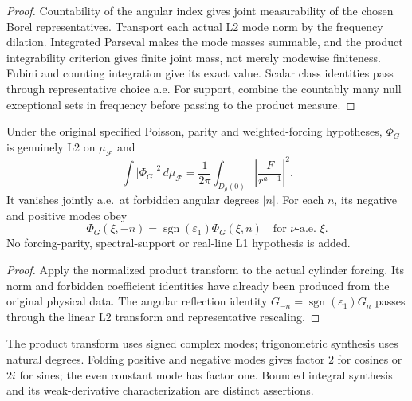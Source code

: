 \begin{proof}
\leanok
Countability of the angular index gives joint measurability of the chosen
Borel representatives. Transport each actual L2 mode norm by the frequency
dilation. Integrated Parseval makes the mode masses summable, and the product
integrability criterion gives finite joint mass, not merely modewise finiteness.
Fubini and counting integration give its exact value.
Scalar class identities pass through representative choice a.e.
For support, combine the countably many null exceptional sets in frequency
before passing to the product measure.
\end{proof}

\begin{lemma}
\label{lem:cylinder-forcing-fourier-data}
\leanok
Under the original specified Poisson, parity and weighted-forcing hypotheses,
$\Phi_G$ is genuinely L2 on $\mu_{\mathcal F}$ and
\[
 \int|\Phi_G|^2\,d\mu_{\mathcal F}
 =\frac1{2\pi}\int_{D_\rho(0)}\left|\frac{F}{r^{a-1}}\right|^2.
\]
It vanishes jointly a.e.\ at forbidden angular degrees $|n|$.
For each $n$, its negative and positive modes obey
\[
 \Phi_G(\xi,-n)=\operatorname{sgn}(\varepsilon_1)\Phi_G(\xi,n)
 \quad\text{for }\nu\text{-a.e. }\xi.
\]
No forcing-parity, spectral-support or real-line L1 hypothesis is added.
\end{lemma}

\begin{proof}
\leanok
Apply the normalized product transform to the actual cylinder forcing.
Its norm and forbidden coefficient identities have already been produced
from the original physical data. The angular reflection identity
$G_{-n}=\operatorname{sgn}(\varepsilon_1)G_n$ passes through the linear L2
transform and representative rescaling.
\end{proof}

\begin{remark}
The product transform uses signed complex modes; trigonometric synthesis uses
natural degrees. Folding positive and negative modes gives factor $2$ for cosines
or $2i$ for sines; the even constant mode has factor one.
Bounded integral synthesis and its weak-derivative characterization are
distinct assertions.
\end{remark}

